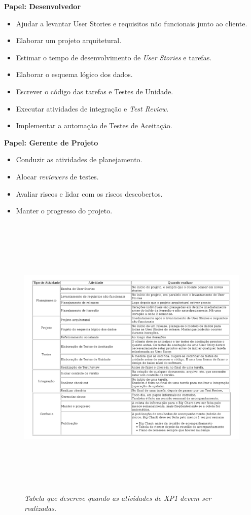 \textbf{Papel: Desenvolvedor}
\begin{itemize}
 \item Ajudar a levantar User Stories e requisitos não funcionais junto ao cliente.
 \item Elaborar um projeto arquitetural.
 \item Estimar o tempo de desenvolvimento de \textit{User Stories} e tarefas.
 \item Elaborar o esquema lógico dos dados.
 \item Escrever o código das tarefas e Testes de Unidade.
 \item Executar atividades de integração e \textit{Test Review}.
 \item Implementar a automação de Testes de Aceitação.
\end{itemize}

\textbf{Papel: Gerente de Projeto}
\begin{itemize}
 \item Conduzir as atividades de planejamento.
 \item Alocar \textit{reviewers} de testes.
 \item Avaliar riscos e lidar com os riscos descobertos.
 \item Manter o progresso do projeto.
\end{itemize}


\begin{figure}[!h]
 \includegraphics[height = 14cm]{tab1.png}
 \caption{\it Tabela que descreve quando as atividades de XP1 devem ser realizadas.} \label{tab:tab1}
\end{figure}

